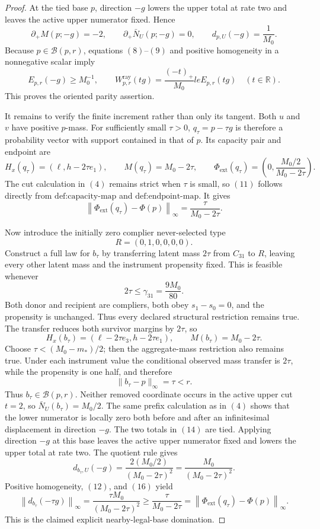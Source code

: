 \documentclass{article}
\begin{document}
\begin{proof}
At the tied base \(p\), direction \(-g\) lowers the upper total at rate two and leaves the active upper numerator fixed.  Hence
\[
 \partial_+M(p;-g)=-2,
 \qquad
 \partial_+\bar N_U(p;-g)=0,
 \qquad
 d_{p,U}(-g)=\frac{1}{M_0}.
\tag{9}
\]
Because \(p\in\mathcal B(p,r)\), equations \((8)\)--\((9)\) and positive homogeneity in a nonnegative scalar imply
\[
 E_{p,r}(-g)\ge M_0^{-1},
 \qquad
 W^{\mathrm{ray}}_{p,r}(tg)=\frac{(-t)_+}{M_0}le E_{p,r}(tg)
 \quad(t\in\mathbb R).
\tag{10}
\]
This proves the oriented parity assertion.

It remains to verify the finite increment rather than only its tangent.  Both \(u\) and \(v\) have positive \(p\)-mass.  For sufficiently small \(\tau>0\), \(q_\tau=p-\tau g\) is therefore a probability vector with support contained in that of \(p\).  Its capacity pair and endpoint are
\[
 H_x(q_\tau)=(\ell,h-2\tau e_1),
 \qquad M(q_\tau)=M_0-2\tau,
 \qquad
 \Phi_{\mathrm{ext}}(q_\tau)
 =\left(0,\frac{M_0/2}{M_0-2\tau}\right).
\tag{11}
\]
The cut calculation in \((4)\) remains strict when \(\tau\) is small, so \((11)\) follows directly from \(\text{def:capacity-map}\) and \(\text{def:endpoint-map}\).  It gives
\[
 \left\|\Phi_{\mathrm{ext}}(q_\tau)-\Phi(p)\right\|_\infty
 =\frac{\tau}{M_0-2\tau}.
\tag{12}
\]

Now introduce the initially zero complier never-selected type
\[
 R=(0,1,0,0,0,0).
\]
Construct a full law for \(b_\tau\) by transferring latent mass \(2\tau\) from \(C_{31}\) to \(R\), leaving every other latent mass and the instrument propensity fixed.  This is feasible whenever
\[
 2\tau\le\gamma_{31}=\frac{9M_0}{80}.
\tag{13}
\]
Both donor and recipient are compliers, both obey \(s_1-s_0=0\), and the propensity is unchanged.  Thus every declared structural restriction remains true.  The transfer reduces both survivor margins by \(2\tau\), so
\[
 H_x(b_\tau)=(\ell-2\tau e_3,h-2\tau e_1),
 \qquad M(b_\tau)=M_0-2\tau.
\tag{14}
\]
Choose \(\tau<(M_0-m_*)/2\); then the aggregate-mass restriction also remains true.  Under each instrument value the conditional observed mass transfer is \(2\tau\), while the propensity is one half, and therefore
\[
 \|b_\tau-p\|_\infty=\tau<r.
\tag{15}
\]
Thus \(b_\tau\in\mathcal B(p,r)\).  Neither removed coordinate occurs in the active upper cut \(t=2\), so \(\bar N_U(b_\tau)=M_0/2\).  The same prefix calculation as in \((4)\) shows that the lower numerator is locally zero both before and after an infinitesimal displacement in direction \(-g\).  The two totals in \((14)\) are tied.  Applying direction \(-g\) at this base leaves the active upper numerator fixed and lowers the upper total at rate two.  The quotient rule gives
\[
 d_{b_\tau,U}(-g)
 =\frac{2(M_0/2)}{(M_0-2\tau)^2}
 =\frac{M_0}{(M_0-2\tau)^2}.
\tag{16}
\]
Positive homogeneity, \((12)\), and \((16)\) yield
\[
 \left\|d_{b_\tau}(-\tau g)\right\|_\infty
 =\frac{\tau M_0}{(M_0-2\tau)^2}
 \ge\frac{\tau}{M_0-2\tau}
 =\left\|\Phi_{\mathrm{ext}}(q_\tau)-\Phi(p)\right\|_\infty.
\]
This is the claimed explicit nearby-legal-base domination.
\end{proof}
\end{document}
